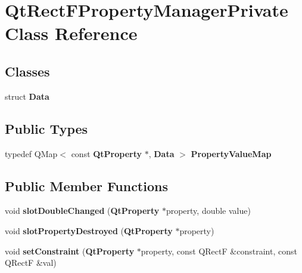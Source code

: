 \section{Qt\+Rect\+F\+Property\+Manager\+Private Class Reference}
\label{classQtRectFPropertyManagerPrivate}
\subsection*{Classes}
\begin{DoxyCompactItemize}
\item 
struct {\bf Data}
\end{DoxyCompactItemize}
\subsection*{Public Types}
\begin{DoxyCompactItemize}
\item 
typedef Q\+Map$<$ const {\bf Qt\+Property} $\ast$, {\bf Data} $>$ {\bf Property\+Value\+Map}
\end{DoxyCompactItemize}
\subsection*{Public Member Functions}
\begin{DoxyCompactItemize}
\item 
void {\bf slot\+Double\+Changed} ({\bf Qt\+Property} $\ast$property, double value)
\item 
void {\bf slot\+Property\+Destroyed} ({\bf Qt\+Property} $\ast$property)
\item 
void {\bf set\+Constraint} ({\bf Qt\+Property} $\ast$property, const Q\+RectF \&constraint, const Q\+RectF \&val)
\end{DoxyCompactItemize}
